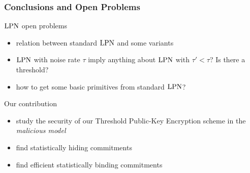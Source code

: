 \begin{frame}
 \frametitle{Conclusions and Open Problems}
 
 \begin{block}{$\mathrm{LPN}$ open problems}
  \begin{itemize}
   \item relation between standard $\mathrm{LPN}$ and some variants
   \item $\mathrm{LPN}$ with noise rate $\tau$ imply anything about $\mathrm{LPN}$ with $\tau' < \tau$? Is there a threshold?
   \item how to get some basic primitives from standard $\mathrm{LPN}$?
  \end{itemize}

 \end{block}
 
 \begin{block}{Our contribution}
\begin{itemize}
 \item study the security of our Threshold Public-Key Encryption scheme in the \emph{malicious model}
 \item find statistically hiding commitments
 \item find efficient statistically binding commitments
\end{itemize}
  
 \end{block}

\end{frame}
